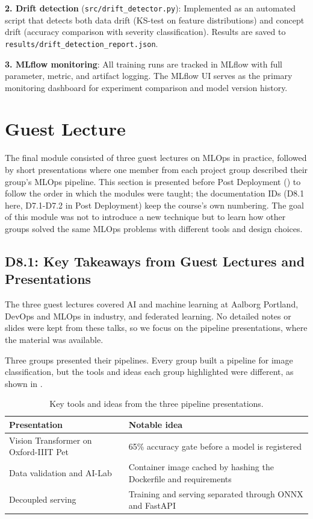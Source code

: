 \documentclass[10pt,twocolumn,letterpaper]{article}
\begin{document}
\textbf{2. Drift detection} (\texttt{src/drift\_detector.py}): Implemented as an automated script that detects both data drift (KS-test on feature distributions) and concept drift (accuracy comparison with severity classification). Results are saved to \texttt{results/drift\_detection\_report.json}.

\textbf{3. MLflow monitoring}: All training runs are tracked in MLflow with full parameter, metric, and artifact logging. The MLflow UI serves as the primary monitoring dashboard for experiment comparison and model version history.

\section{Guest Lecture}\label{sec:guest-lecture}

The final module consisted of three guest lectures on MLOps in practice, followed by short presentations where one member from each project group described their group's MLOps pipeline. This section is presented before Post Deployment () to follow the order in which the modules were taught; the documentation IDs (D8.1 here, D7.1-D7.2 in Post Deployment) keep the course's own numbering. The goal of this module was not to introduce a new technique but to learn how other groups solved the same MLOps problems with different tools and design choices.

\subsection{D8.1: Key Takeaways from Guest Lectures and Presentations}

The three guest lectures covered AI and machine learning at Aalborg Portland, DevOps and MLOps in industry, and federated learning. No detailed notes or slides were kept from these talks, so we focus on the pipeline presentations, where the material was available.

Three groups presented their pipelines. Every group built a pipeline for image classification, but the tools and ideas each group highlighted were different, as shown in .

\begin{table}[h]
\centering
\caption{Key tools and ideas from the three pipeline presentations.}
\label{tab:presentations}
\begin{tabularx}{\linewidth}{@{} l X @{}}
\toprule
\textbf{Presentation} & \textbf{Notable idea} \\
\midrule
Vision Transformer on Oxford-IIIT Pet & 65\% accuracy gate before a model is registered \\
Data validation and AI-Lab & Container image cached by hashing the Dockerfile and requirements \\
Decoupled serving & Training and serving separated through ONNX and FastAPI \\
\bottomrule
\end{tabularx}
\end{table}
\end{document}
